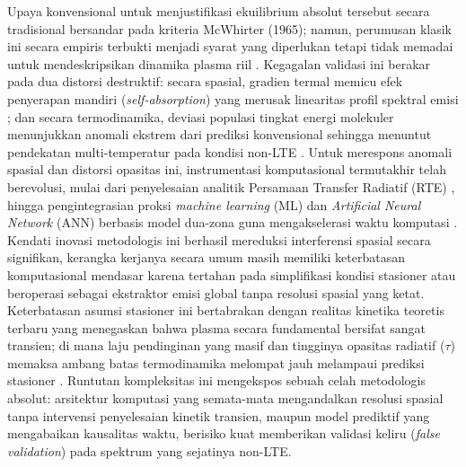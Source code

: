 \documentclass[10pt,leqno]{amsart}
\begin{document}
Upaya konvensional untuk menjustifikasi ekuilibrium absolut tersebut secara tradisional bersandar pada kriteria McWhirter (1965); namun, perumusan klasik ini secara empiris terbukti menjadi syarat yang diperlukan tetapi tidak memadai untuk mendeskripsikan dinamika plasma riil \cite{bultel_mcwhirter_2025}. Kegagalan validasi ini berakar pada dua distorsi destruktif: secara spasial, gradien termal memicu efek penyerapan mandiri (\textit{self-absorption}) yang merusak linearitas profil spektral emisi \cite{tang_review_2024}; dan secara termodinamika, deviasi populasi tingkat energi molekuler menunjukkan anomali ekstrem dari prediksi konvensional sehingga menuntut pendekatan multi-temperatur pada kondisi non-LTE \cite{terashkevich_two-temperature_2024}. Untuk merespons anomali spasial dan distorsi opasitas ini, instrumentasi komputasional termutakhir telah berevolusi, mulai dari penyelesaian analitik Persamaan Transfer Radiatif (RTE) \cite{favre_merlin_2025}, hingga pengintegrasian proksi \textit{machine learning} (ML) dan \textit{Artificial Neural Network} (ANN) berbasis model dua-zona guna mengakselerasi waktu komputasi \cite{zaitsev_two-zone_2024, amogh_libs_2026, favre_towards_2025}. Kendati inovasi metodologis ini berhasil mereduksi interferensi spasial secara signifikan, kerangka kerjanya secara umum masih memiliki keterbatasan komputasional mendasar karena tertahan pada simplifikasi kondisi stasioner atau beroperasi sebagai ekstraktor emisi global tanpa resolusi spasial yang ketat. Keterbatasan asumsi stasioner ini bertabrakan dengan realitas kinetika teoretis terbaru yang menegaskan bahwa plasma secara fundamental bersifat sangat transien; di mana laju pendinginan yang masif dan tingginya opasitas radiatif ($\tau$) memaksa ambang batas termodinamika melompat jauh melampaui prediksi stasioner \cite{bultel_mcwhirter_2025}. Runtutan kompleksitas ini mengekspos sebuah celah metodologis absolut: arsitektur komputasi yang semata-mata mengandalkan resolusi spasial tanpa intervensi penyelesaian kinetik transien, maupun model prediktif yang mengabaikan kausalitas waktu, berisiko kuat memberikan validasi keliru (\textit{false validation}) pada spektrum yang sejatinya non-LTE.
\end{document}
